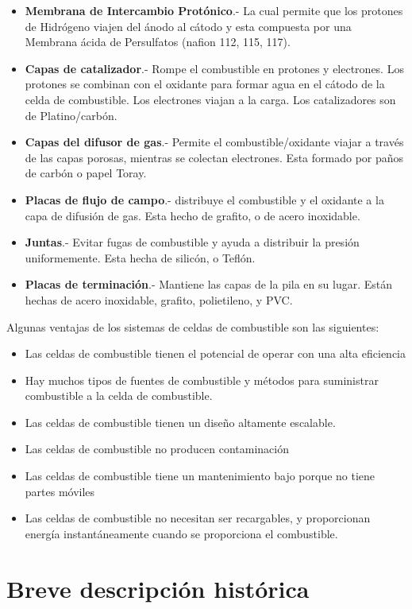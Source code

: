 \documentclass[12pt]{book}
\theoremstyle{definition}
\theoremstyle{remark}
\theoremstyle{plain}
\begin{document}
\begin{itemize}
\item \textbf{Membrana de Intercambio Protónico}.- La cual permite que los protones de Hidrógeno viajen del ánodo al cátodo y esta compuesta por una Membrana ácida de Persulfatos (nafion 112, 115, 117).
\item \textbf{Capas de catalizador}.- Rompe el combustible en protones y electrones. Los protones se combinan con el oxidante para formar agua en el cátodo de la celda de combustible. Los electrones viajan a la carga. Los catalizadores son de Platino/carbón.
\item \textbf{Capas del difusor de gas}.- Permite el combustible/oxidante viajar a través de las capas porosas, mientras se colectan electrones. Esta formado por paños de carbón o papel Toray.
\item \textbf{Placas de flujo de campo}.- distribuye el combustible y el oxidante a la capa de difusión de gas. Esta hecho de grafito, o de acero inoxidable.
\item \textbf{Juntas}.- Evitar fugas de combustible y ayuda a distribuir la presión uniformemente. Esta hecha de silicón, o Teflón.
\item \textbf{Placas de terminación}.- Mantiene las capas de la pila en su lugar. Están hechas de acero inoxidable, grafito, polietileno, y PVC.
\end{itemize}

Algunas ventajas de los sistemas de celdas de combustible son las siguientes:

\begin{itemize}
\item Las celdas de combustible tienen el potencial de operar con una alta eficiencia
\item Hay muchos tipos de fuentes de combustible y métodos para suministrar combustible a la celda de combustible.
\item Las celdas de combustible tienen un diseño altamente escalable.
\item Las celdas de combustible no producen contaminación
\item Las celdas de combustible tiene un mantenimiento bajo porque no tiene partes móviles
\item Las celdas de combustible no necesitan ser recargables, y proporcionan energía instantáneamente cuando se proporciona el combustible.
\end{itemize}

\section{Breve descripción histórica}
\end{document}
